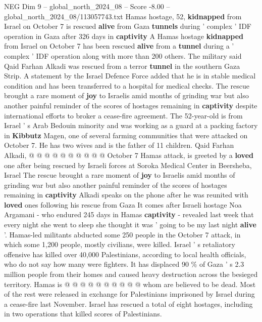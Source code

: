 \begin{textsample}{NEG Dim 9 – global\_north\_2024\_08 – Score -8.00 – global\_north\_2024\_08/113057743.txt}  \label{ex:f9_neg_086}
Hamas hostage, 52, \textbf{kidnapped} from Israel on October 7 is rescued \textbf{alive} from Gaza \textbf{tunnels} during ' complex ' IDF operation in Gaza after 326 days in \textbf{captivity} A Hamas hostage \textbf{kidnapped} from Israel on October 7 has been rescued \textbf{alive} from a \textbf{tunnel} during a ' complex ' IDF operation along with more than 200 others.
The military said Qaid Farhan Alkadi was rescued from a terror \textbf{tunnel} in the southern Gaza Strip.
A statement by the Israel Defence Force added that he is in stable medical condition and has been transferred to a hospital for medical checks.
The rescue brought a rare moment of \textbf{joy} to Israelis amid months of grinding war but also another painful reminder of the scores of hostages remaining in \textbf{captivity} despite international efforts to broker a cease-fire agreement.
The 52-year-old is from Israel ' s Arab Bedouin minority and was working as a guard at a packing factory in \textbf{Kibbutz} Magen, one of several farming communities that were attacked on October 7.
He has two wives and is the father of 11 children.
Qaid Farhan Alkadi, @ @ @ @ @ @ @ @ @ @ October 7 Hamas attack, is greeted by a \textbf{loved} one after being rescued by Israeli forces at Soroka Medical Center in Beersheba, Israel The rescue brought a rare moment of \textbf{joy} to Israelis amid months of grinding war but also another painful reminder of the scores of hostages remaining in \textbf{captivity} Alkadi speaks on the phone after he was reunited with \textbf{loved} ones following his rescue from Gaza It comes after Israeli hostage Noa Argamani - who endured 245 days in Hamas \textbf{captivity} - revealed last week that every night she went to sleep she thought it was ' going to be my last night \textbf{alive} '.
Hamas-led militants abducted some 250 people in the October 7 attack, in which some 1,200 people, mostly civilians, were killed.
Israel ' s retaliatory offensive has killed over 40,000 Palestinians, according to local health officials, who do not say how many were fighters.
It has displaced 90 \% of Gaza ' s 2.3 million people from their homes and caused heavy destruction across the besieged territory.
Hamas is @ @ @ @ @ @ @ @ @ @ whom are believed to be dead.
Most of the rest were released in exchange for Palestinians imprisoned by Israel during a cease-fire last November.
Israel has rescued a total of eight hostages, including in two operations that killed scores of Palestinians.

\end{textsample}
